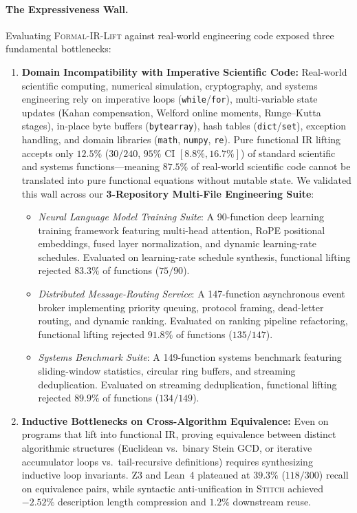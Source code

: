\documentclass[10pt,twocolumn]{article}
\begin{document}
\paragraph{The Expressiveness Wall.}
Evaluating \textsc{Formal-IR-Lift} against real-world engineering code exposed three fundamental bottlenecks:
\begin{enumerate}
    \item \textbf{Domain Incompatibility with Imperative Scientific Code:} Real-world scientific computing, numerical simulation, cryptography, and systems engineering rely on imperative loops (\texttt{while}/\texttt{for}), multi-variable state updates (Kahan compensation, Welford online moments, Runge--Kutta stages), in-place byte buffers (\texttt{bytearray}), hash tables (\texttt{dict}/\texttt{set}), exception handling, and domain libraries (\texttt{math}, \texttt{numpy}, \texttt{re}). Pure functional IR lifting accepts only $12.5\%$ ($30/240$, $95\%$ CI $[8.8\%, 16.7\%]$) of standard scientific and systems functions---meaning $87.5\%$ of real-world scientific code cannot be translated into pure functional equations without mutable state. We validated this wall across our \textbf{3-Repository Multi-File Engineering Suite}:
    \begin{itemize}
        \item \emph{Neural Language Model Training Suite}: A 90-function deep learning training framework featuring multi-head attention, RoPE positional embeddings, fused layer normalization, and dynamic learning-rate schedules. Evaluated on learning-rate schedule synthesis, functional lifting rejected $83.3\%$ of functions ($75/90$).
        \item \emph{Distributed Message-Routing Service}: A 147-function asynchronous event broker implementing priority queuing, protocol framing, dead-letter routing, and dynamic ranking. Evaluated on ranking pipeline refactoring, functional lifting rejected $91.8\%$ of functions ($135/147$).
        \item \emph{Systems Benchmark Suite}: A 149-function systems benchmark featuring sliding-window statistics, circular ring buffers, and streaming deduplication. Evaluated on streaming deduplication, functional lifting rejected $89.9\%$ of functions ($134/149$).
    \end{itemize}
    \item \textbf{Inductive Bottlenecks on Cross-Algorithm Equivalence:} Even on programs that lift into functional IR, proving equivalence between distinct algorithmic structures (Euclidean vs.\ binary Stein GCD, or iterative accumulator loops vs.\ tail-recursive definitions) requires synthesizing inductive loop invariants. Z3 and Lean~4 plateaued at $39.3\%$ ($118/300$) recall on equivalence pairs, while syntactic anti-unification in \textsc{Stitch} achieved $-2.52\%$ description length compression and $1.2\%$ downstream reuse.

\end{enumerate}
\end{document}
